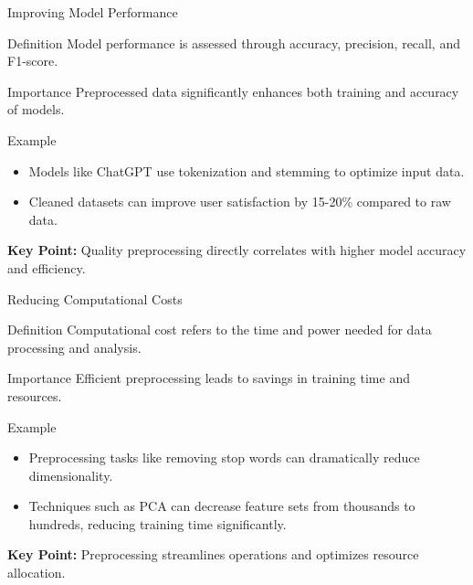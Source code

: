 \documentclass[aspectratio=169]{beamer}
\begin{document}
\begin{frame}[fragile]{Improving Model Performance}
    \begin{block}{Definition}
        Model performance is assessed through accuracy, precision, recall, and F1-score.
    \end{block}
    
    \begin{block}{Importance}
        Preprocessed data significantly enhances both training and accuracy of models.
    \end{block}
    
    \begin{block}{Example}
        \begin{itemize}
            \item Models like ChatGPT use tokenization and stemming to optimize input data.
            \item Cleaned datasets can improve user satisfaction by 15-20\% compared to raw data.
        \end{itemize}
    \end{block}
    
    \textbf{Key Point:} Quality preprocessing directly correlates with higher model accuracy and efficiency.
\end{frame}

\begin{frame}[fragile]{Reducing Computational Costs}
    \begin{block}{Definition}
        Computational cost refers to the time and power needed for data processing and analysis.
    \end{block}
    
    \begin{block}{Importance}
        Efficient preprocessing leads to savings in training time and resources.
    \end{block}
    
    \begin{block}{Example}
        \begin{itemize}
            \item Preprocessing tasks like removing stop words can dramatically reduce dimensionality.
            \item Techniques such as PCA can decrease feature sets from thousands to hundreds, reducing training time significantly.
        \end{itemize}
    \end{block}
    
    \textbf{Key Point:} Preprocessing streamlines operations and optimizes resource allocation.
\end{frame}
\end{document}

